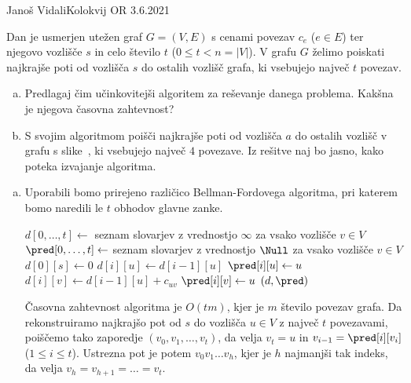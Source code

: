 \begin{naloga}{Janoš Vidali}{Kolokvij OR 3.6.2021}
\begin{vprasanje}
Dan je usmerjen utežen graf $G = (V, E)$ s cenami povezav $c_e$ ($e \in E$)
ter njegovo vozlišče $s$ in celo število $t$ ($0 \le t < n = |V|$).
V grafu $G$ želimo poiskati najkrajše poti
od vozlišča $s$ do ostalih vozlišč grafa,
ki vsebujejo največ $t$ povezav.

\begin{enumerate}[(a)]
\item Predlagaj čim učinkovitejši algoritem za reševanje danega problema.
Kakšna je njegova časovna zahtevnost?

\item S svojim algoritmom poišči najkrajše poti
od vozlišča $a$ do ostalih vozlišč v grafu s slike~\fig,
ki vsebujejo največ $4$ povezave.
Iz rešitve naj bo jasno, kako poteka izvajanje algoritma.
\end{enumerate}
%
\begin{slika}
\makebox[\textwidth][c]{
\pgfslika
}
\end{slika}
\end{vprasanje}

\begin{odgovor}
\begin{enumerate}[(a)]
\item Uporabili bomo prirejeno različico Bellman-Fordovega algoritma,
pri katerem bomo naredili le $t$ obhodov glavne zanke.
\begin{small}
\begin{algorithmic}
    \State $d[0, \dots, t] \gets$ seznam slovarjev z vrednostjo $\infty$ za vsako vozlišče $v \in V$
    \State $\pred[0, \dots, t] \gets$ seznam slovarjev z vrednostjo $\Null$
	za vsako vozlišče $v \in V$
    \State $d[0][s] \gets 0$
            \State $d[i][u] \gets d[i-1][u]$
            \State $\pred[i][u] \gets u$
        \EndFor
                \State $d[i][v] \gets d[i-1][u] + c_{uv}$
                \State $\pred[i][v] \gets u$
            \EndIf
        \EndFor
    \EndFor
    \State \Return $(d, \pred)$
\EndFunction
\end{algorithmic}
\end{small}
Časovna zahtevnost algoritma je $O(tm)$,
kjer je $m$ število povezav grafa.
Da rekonstruiramo najkrajšo pot od $s$ do vozlišča $u \in V$
z največ $t$ povezavami,
poiščemo tako zaporedje $(v_0, v_1, \dots, v_t)$,
da velja $v_t = u$ in $v_{i-1} = \pred[i][v_i]$ ($1 \le i \le t$).
Ustrezna pot je potem $v_0 v_1 \dots v_h$,
kjer je $h$ najmanjši tak indeks, da velja $v_h = v_{h+1} = \dots = v_t$.


\end{enumerate}
\end{odgovor}
\end{naloga}
